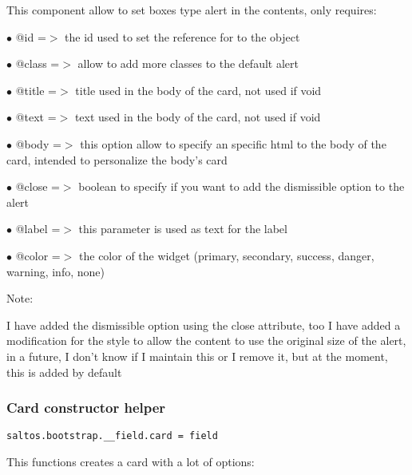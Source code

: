 \documentclass[a4paper]{article}
\begin{document}
This component allow to set boxes type alert in the contents, only requires:

\begin{compactitem}
\item[\color{myblue}$\bullet$] @id    =$>$ the id used to set the reference for to the object
\item[\color{myblue}$\bullet$] @class =$>$ allow to add more classes to the default alert
\item[\color{myblue}$\bullet$] @title =$>$ title used in the body of the card, not used if void
\item[\color{myblue}$\bullet$] @text  =$>$ text used in the body of the card, not used if void
\item[\color{myblue}$\bullet$] @body  =$>$ this option allow to specify an specific html to the body of the card, intended
          to personalize the body's card
\item[\color{myblue}$\bullet$] @close =$>$ boolean to specify if you want to add the dismissible option to the alert
\item[\color{myblue}$\bullet$] @label =$>$ this parameter is used as text for the label
\item[\color{myblue}$\bullet$] @color =$>$ the color of the widget (primary, secondary, success, danger, warning, info, none)
\end{compactitem}

Note:

I have added the dismissible option using the close attribute, too I have added a modification
for the style to allow the content to use the original size of the alert, in a future, I don't
know if I maintain this or I remove it, but at the moment, this is added by default

\hypertarget{toc635}{}
\subsubsection{Card constructor helper}

\begin{lstlisting}
saltos.bootstrap.__field.card = field
\end{lstlisting}

This functions creates a card with a lot of options:
\end{document}
